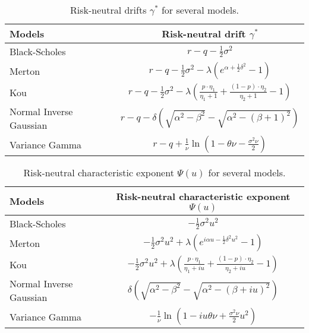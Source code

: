 \begin{table}[!ht]
\centering
  \begin{tabular}{l|c}
    \toprule
    Models & Risk-neutral drift $\gamma^\ast$ \\
    \toprule
   Black-Scholes & $r-q-\frac{1}{2}\sigma^2$ \\
   \midrule
   Merton & $r-q -\frac{1}{2}\sigma^2 - \lambda\left(e^{\alpha+\frac{1}{2}\delta^2}-1\right)$\\
   Kou & $r-q- \frac{1}{2}\sigma^2 -\lambda \left(\frac{p\cdot\eta_1}{\eta_1+1}+\frac{(1-p)\cdot\eta_2}{\eta_2+1}-1\right)$\\
   \midrule
   Normal Inverse Gaussian & $r-q -\delta \left(\sqrt{\alpha^2-\beta^2}-\sqrt{\alpha^2-(\beta+1)^2}\right) $\\
   Variance Gamma &$r-q + \frac{1}{\nu}\ln\left(1-\theta\nu-\frac{\sigma^2\nu}{2}\right)$ \\
    \bottomrule
  \end{tabular}
  \vspace{5pt}
  \caption{\label{tab:rn_drift} Risk-neutral drifts $\gamma^\ast$ for several models.}
\end{table}

\begin{table}[!ht]
\centering
  \begin{tabular}{l|c}
    \toprule
    Models & Risk-neutral characteristic exponent $\Psi(u)$ \\
    \toprule
   Black-Scholes & $-\frac{1}{2}\sigma^2u^2$ \\
   \midrule
   Merton & $-\frac{1}{2}\sigma^2 u^2 + \lambda\left(e^{i\alpha u -\frac{1}{2}\delta^2 u^2}-1\right)$\\
   Kou & $-\frac{1}{2}\sigma^2 u^2 +\lambda\left(\frac{p\cdot\eta_1}{\eta_1+iu}+\frac{(1-p)\cdot\eta_2}{\eta_2+iu}-1\right)$\\
   \midrule
   Normal Inverse Gaussian & $\delta \left(\sqrt{\alpha^2-\beta^2}-\sqrt{\alpha^2-(\beta+iu)^2}\right)$\\
   Variance Gamma &$-\frac{1}{\nu}\ln\left(1-iu\theta\nu+\frac{\sigma^2\nu}{2}u^2\right)$ \\
    \bottomrule
  \end{tabular}
  \vspace{5pt}
  \caption{\label{tab:rn_ce} Risk-neutral characteristic exponent $\Psi(u)$ for several models.}
\end{table}

